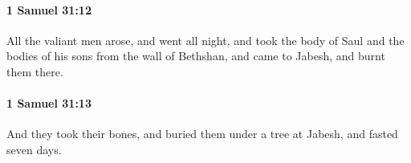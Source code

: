 		\paragraph{1 Samuel 31:12} %
			\label{1SAMUEL-31-12}

			All the valiant men arose, and went all night, and took the body of Saul and the bodies of his sons from the wall of Bethshan, and came to Jabesh, and burnt them there.


		\paragraph{1 Samuel 31:13} %
			\label{1SAMUEL-31-13}

			And they took their bones, and buried them under a tree at Jabesh, and fasted seven days.

